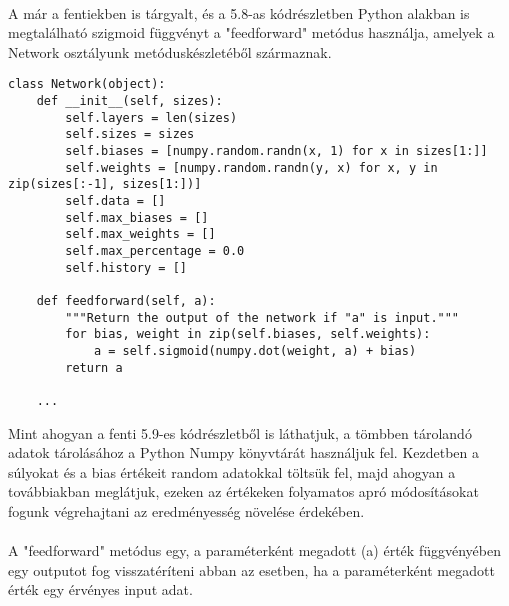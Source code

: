 \paragraph{}
A már a fentiekben is tárgyalt, és a 5.8-as kódrészletben Python alakban is megtalálható szigmoid függvényt a "feedforward" metódus használja, amelyek a Network osztályunk metóduskészletéből származnak.

\begin{lstlisting}[caption=A Network osztály konstruktora illetve a feedforward függvény]
class Network(object):
    def __init__(self, sizes):
        self.layers = len(sizes)
        self.sizes = sizes
        self.biases = [numpy.random.randn(x, 1) for x in sizes[1:]]
        self.weights = [numpy.random.randn(y, x) for x, y in zip(sizes[:-1], sizes[1:])]
        self.data = []
        self.max_biases = []
        self.max_weights = []
        self.max_percentage = 0.0
        self.history = []

    def feedforward(self, a):
        """Return the output of the network if "a" is input."""
        for bias, weight in zip(self.biases, self.weights):
            a = self.sigmoid(numpy.dot(weight, a) + bias)
        return a
        
    ...  
\end{lstlisting}

Mint ahogyan a fenti 5.9-es kódrészletből is láthatjuk, a tömbben tárolandó adatok tárolásához a Python Numpy könyvtárát használjuk fel. Kezdetben a súlyokat és a bias értékeit random adatokkal töltsük fel, majd ahogyan a továbbiakban meglátjuk, ezeken az értékeken folyamatos apró módosításokat fogunk végrehajtani az eredményesség növelése érdekében.

\paragraph{}
A "feedforward" metódus egy, a paraméterként megadott (a) érték függvényében egy outputot fog visszatéríteni abban az esetben, ha a paraméterként megadott érték egy érvényes input adat.

